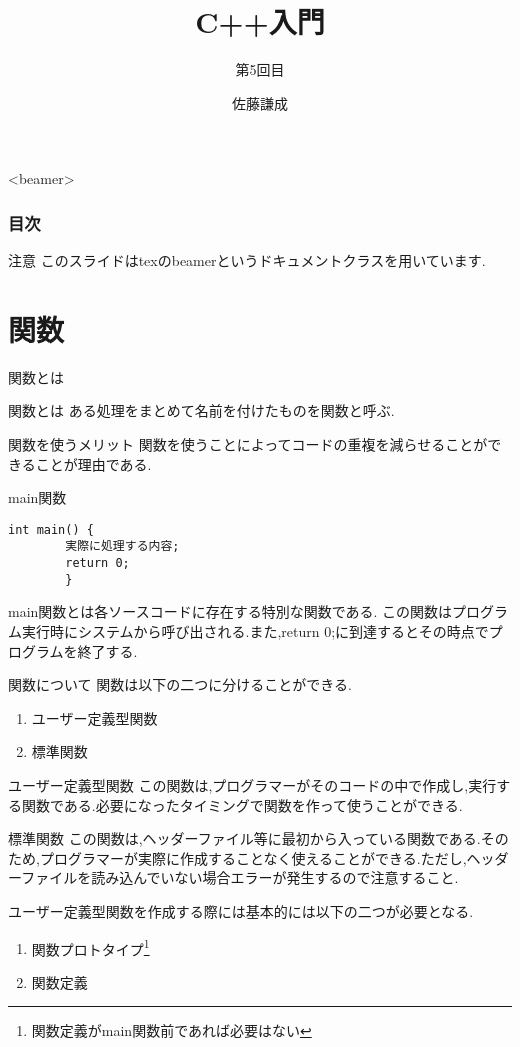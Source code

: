 \documentclass[xdvipdfmx, 8pt, t]{beamer}
\title{C++入門}
\subtitle{第5回目}
\author{佐藤謙成}
\begin{document}
\begin{frame}
    \titlepage
\end{frame}

\begin{frame}<beamer>
\frametitle{目次}
    \tableofcontents[]
\end{frame}

\begin{frame}{注意}
    このスライドはtexのbeamerというドキュメントクラスを用いています.
\end{frame}
\section{関数}
\begin{frame}{関数とは}
    \begin{block}{関数とは}
         ある処理をまとめて名前を付けたものを関数と呼ぶ.
    \end{block}
    \begin{block}{関数を使うメリット}
        関数を使うことによってコードの重複を減らせることができることが理由である.
    \end{block}
\end{frame}

\begin{frame}[fragile]{main関数}
    \begin{lstlisting}[caption=main関数]
        int main() {
        実際に処理する内容;
        return 0;
        }
    \end{lstlisting}

    main関数とは各ソースコードに存在する特別な関数である.
    この関数はプログラム実行時にシステムから呼び出される.また,return 0;に到達するとその時点でプログラムを終了する.
\end{frame}
\begin{frame}{関数について}
    関数は以下の二つに分けることができる.
    \begin{enumerate}
        \item ユーザー定義型関数
        \item 標準関数
    \end{enumerate}
    \begin{block}{ユーザー定義型関数}
        この関数は,プログラマーがそのコードの中で作成し,実行する関数である.必要になったタイミングで関数を作って使うことができる.
    \end{block}
    \begin{block}{標準関数}
       この関数は,ヘッダーファイル等に最初から入っている関数である.そのため,プログラマーが実際に作成することなく使えることができる.ただし,ヘッダーファイルを読み込んでいない場合エラーが発生するので注意すること. 
    \end{block}
    ユーザー定義型関数を作成する際には基本的には以下の二つが必要となる.
    \begin{enumerate}
        \item 関数プロトタイプ\footnote{関数定義がmain関数前であれば必要はない}
        \item 関数定義
    \end{enumerate}
\end{frame}
\end{document}
